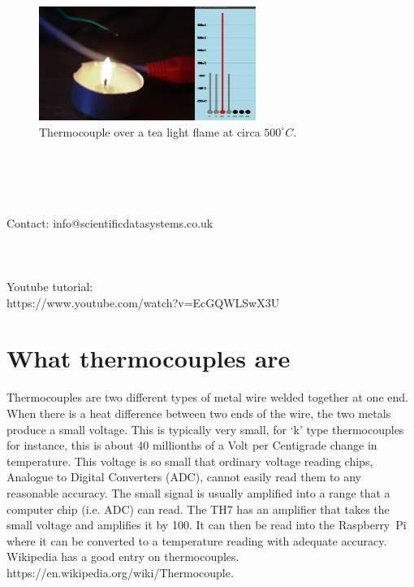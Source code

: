 \documentclass[10pt,foldmark]{leaflet}
\begin{document}
\clearpage
\begin{figure}[ht]
 \centering
 \includegraphics[width=200pt]{TH7_tea_light.jpg}
 \caption{Thermocouple over a tea light flame at circa ${500}^{\circ} C$.}
 \label{fig:pi}
\end{figure}
\mbox{}
\\
\\
\\
\\
\vspace{0.5cm}
Contact: info@scientificdatasystems.co.uk
\\
\\
\\
\\
Youtube tutorial:
\\
https://www.youtube.com/watch?v=EcGQWLSwX3U
\vspace{0.5cm}
\clearpage

\section{What thermocouples are}

Thermocouples are two different types of metal wire welded together
at one end.
%
When there is a heat difference between two ends of the wire,
the two metals produce a small voltage.
%
This is typically very small, for `k' type thermocouples for instance,
this is about 40 millionths of a Volt per Centigrade change in temperature.
%
This voltage is so small that ordinary voltage reading chips, Analogue to Digital Converters (ADC),  cannot easily read them
to any reasonable accuracy.
%
The small signal is usually amplified
into a range that a computer chip (i.e. ADC) can read.
%
The TH7 has an amplifier that takes the small voltage and amplifies it by 100.
%
It can then be read into the Raspberry~Pi where it can be converted to
a temperature reading with adequate accuracy.
%
Wikipedia has a good entry on thermocouples.
https://en.wikipedia.org/wiki/Thermocouple.
\end{document}
